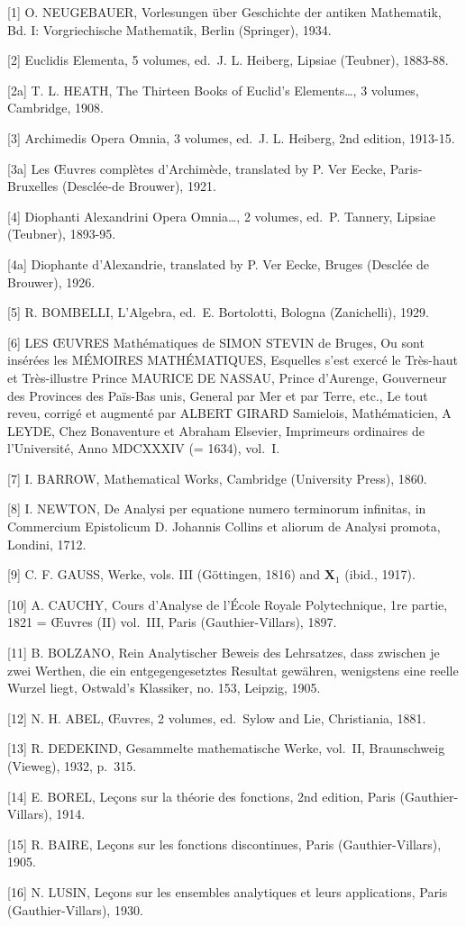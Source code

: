 
{[}1{]} O. NEUGEBAUER, Vorlesungen über Geschichte der antiken Mathematik, Bd. I: Vorgriechische Mathematik, Berlin (Springer), 1934.

{[}2{]} Euclidis Elementa, 5 volumes, ed.~J. L. Heiberg, Lipsiae (Teubner), 1883-88.

{[}2a{]} T. L. HEATH, The Thirteen Books of Euclid's Elements\ldots, 3 volumes, Cambridge, 1908.

{[}3{]} Archimedis Opera Omnia, 3 volumes, ed.~J. L. Heiberg, 2nd edition, 1913-15.

{[}3a{]} Les Œuvres complètes d'Archimède, translated by P. Ver Eecke, Paris-Bruxelles (Desclée-de Brouwer), 1921.

{[}4{]} Diophanti Alexandrini Opera Omnia\ldots, 2 volumes, ed.~P. Tannery, Lipsiae (Teubner), 1893-95.

{[}4a{]} Diophante d'Alexandrie, translated by P. Ver Eecke, Bruges (Desclée de Brouwer), 1926.

{[}5{]} R. BOMBELLI, L'Algebra, ed.~E. Bortolotti, Bologna (Zanichelli), 1929.

{[}6{]} LES ŒUVRES Mathématiques de SIMON STEVIN de Bruges, Ou sont insérées les MÉMOIRES MATHÉMATIQUES, Esquelles s'est exercé le Très-haut et Très-illustre Prince MAURICE DE NASSAU, Prince d'Aurenge, Gouverneur des Provinces des Païs-Bas unis, General par Mer et par Terre, etc., Le tout reveu, corrigé et augmenté par ALBERT GIRARD Samielois, Mathématicien, A LEYDE, Chez Bonaventure et Abraham Elsevier, Imprimeurs ordinaires de l'Université, Anno MDCXXXIV (= 1634), vol.~I.

{[}7{]} I. BARROW, Mathematical Works, Cambridge (University Press), 1860.

{[}8{]} I. NEWTON, De Analysi per equatione numero terminorum infinitas, in Commercium Epistolicum D. Johannis Collins et aliorum de Analysi promota, Londini, 1712.

{[}9{]} C. F. GAUSS, Werke, vols. III (Göttingen, 1816) and \(\mathbf{X}_1\) (ibid., 1917).

{[}10{]} A. CAUCHY, Cours d'Analyse de l'École Royale Polytechnique, 1re partie, 1821 = Œuvres (II) vol.~III, Paris (Gauthier-Villars), 1897.

{[}11{]} B. BOLZANO, Rein Analytischer Beweis des Lehrsatzes, dass zwischen je zwei Werthen, die ein entgegengesetztes Resultat gewähren, wenigstens eine reelle Wurzel liegt, Ostwald's Klassiker, no. 153, Leipzig, 1905.

{[}12{]} N. H. ABEL, Œuvres, 2 volumes, ed.~Sylow and Lie, Christiania, 1881.

{[}13{]} R. DEDEKIND, Gesammelte mathematische Werke, vol.~II, Braunschweig (Vieweg), 1932, p.~315.

{[}14{]} E. BOREL, Leçons sur la théorie des fonctions, 2nd edition, Paris (Gauthier-Villars), 1914.

{[}15{]} R. BAIRE, Leçons sur les fonctions discontinues, Paris (Gauthier-Villars), 1905.

{[}16{]} N. LUSIN, Leçons sur les ensembles analytiques et leurs applications, Paris (Gauthier-Villars), 1930.

